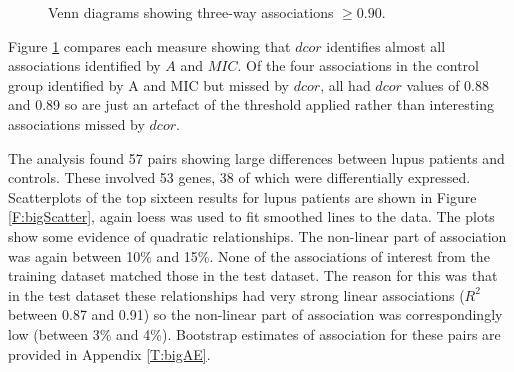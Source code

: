 \documentclass[a4paper, 12pt]{report}
\begin{document}
\begin{figure}
    \centering
    \qquad
    \caption{Venn diagrams showing three-way associations $\ge 0.90$.}
    \label{F:VennBig}
\end{figure}

Figure \ref{F:VennBig} compares each measure showing that $dcor$ identifies almost all associations identified by $A$ and $MIC$. Of the four associations in the control group identified by A and MIC but missed by $dcor$, all had $dcor$ values of 0.88 and 0.89 so are just an artefact of the threshold applied rather than interesting associations missed by $dcor$. 

The analysis found 57 pairs showing large differences between lupus patients and controls. These involved 53 genes, 38 of which were differentially expressed.  Scatterplots of the top sixteen results for lupus patients are shown in Figure \ref{F:bigScatter}, again loess was used to fit smoothed lines to the data. The plots show some evidence of quadratic relationships. The non-linear part of association was again between 10\% and 15\%.  None of the associations of interest from the training dataset matched those in the test dataset. The reason for this was that in the test dataset these relationships had very strong linear associations ($R^2$ between 0.87 and 0.91) so the non-linear part of association was correspondingly low (between 3\% and 4\%). Bootstrap estimates of association for these pairs are provided in Appendix \ref{T:bigAE}.
\end{document}
